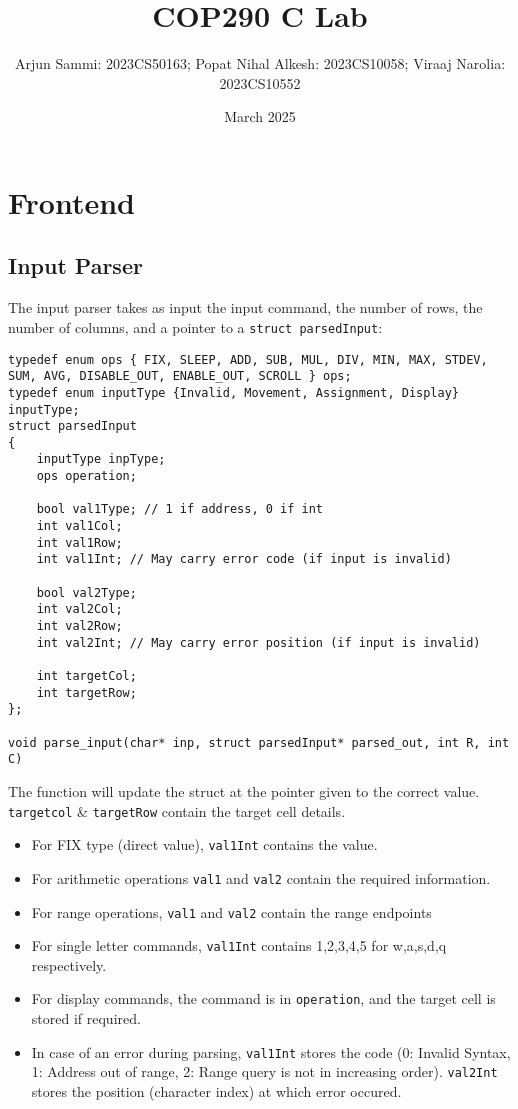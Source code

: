 \documentclass{article}
\title{COP290 C Lab}
\author{Arjun Sammi: 2023CS50163; Popat Nihal Alkesh: 2023CS10058; Viraaj Narolia: 2023CS10552}
\date{March 2025}
\begin{document}
\maketitle

\section{Frontend}
\subsection{Input Parser}
The input parser takes as input the input command, the number of rows, the number of columns, and a pointer to a \lstinline{struct parsedInput}:
\begin{lstlisting}
typedef enum ops { FIX, SLEEP, ADD, SUB, MUL, DIV, MIN, MAX, STDEV, SUM, AVG, DISABLE_OUT, ENABLE_OUT, SCROLL } ops;
typedef enum inputType {Invalid, Movement, Assignment, Display} inputType;
struct parsedInput
{
    inputType inpType;
    ops operation;

    bool val1Type; // 1 if address, 0 if int
    int val1Col; 
    int val1Row;
    int val1Int; // May carry error code (if input is invalid)

    bool val2Type;
    int val2Col;
    int val2Row;
    int val2Int; // May carry error position (if input is invalid)

    int targetCol;
    int targetRow;
};

void parse_input(char* inp, struct parsedInput* parsed_out, int R, int C)
\end{lstlisting}
The function will update the struct at the pointer given to the correct value. \lstinline{targetcol} \& \lstinline{targetRow} contain the target cell details.
\begin{itemize}
    \item For FIX type (direct value), \lstinline{val1Int} contains the value.
    \item For arithmetic operations \lstinline{val1} and \lstinline{val2} contain the required information.
    \item For range operations, \lstinline{val1} and \lstinline{val2} contain the range endpoints
    \item For single letter commands, \lstinline{val1Int} contains 1,2,3,4,5 for w,a,s,d,q respectively.
    \item For display commands, the command is in \lstinline{operation}, and the target cell is stored if required.
    \item In case of an error during parsing, \lstinline{val1Int} stores the code (0: Invalid Syntax, 1: Address out of range, 2: Range query is not in increasing order). \lstinline{val2Int} stores the position (character index) at which error occured.
\end{itemize}
\end{document}
